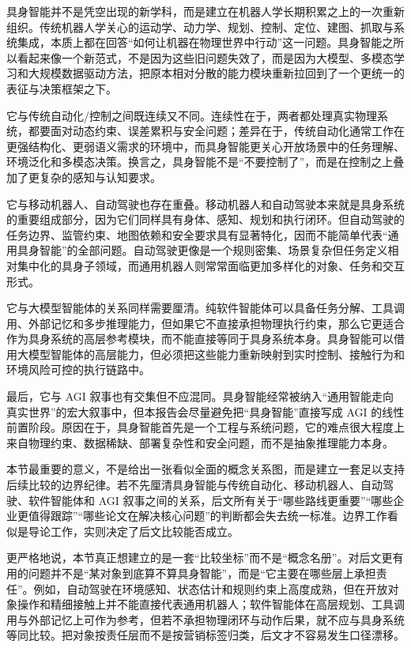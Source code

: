 具身智能并不是凭空出现的新学科，而是建立在机器人学长期积累之上的一次重新组织。传统机器人学关心的运动学、动力学、规划、控制、定位、建图、抓取与系统集成，本质上都在回答“如何让机器在物理世界中行动”这一问题。具身智能之所以看起来像一个新范式，不是因为这些旧问题失效了，而是因为大模型、多模态学习和大规模数据驱动方法，把原本相对分散的能力模块重新拉回到了一个更统一的表征与决策框架之下。

它与传统自动化/控制之间既连续又不同。连续性在于，两者都处理真实物理系统，都要面对动态约束、误差累积与安全问题；差异在于，传统自动化通常工作在更强结构化、更弱语义需求的环境中，而具身智能更关心开放场景中的任务理解、环境泛化和多模态决策。换言之，具身智能不是“不要控制了”，而是在控制之上叠加了更复杂的感知与认知要求。

它与移动机器人、自动驾驶也存在重叠。移动机器人和自动驾驶本来就是具身系统的重要组成部分，因为它们同样具有身体、感知、规划和执行闭环。但自动驾驶的任务边界、监管约束、地图依赖和安全要求具有显著特化，因而不能简单代表“通用具身智能”的全部问题。自动驾驶更像是一个规则密集、场景复杂但任务定义相对集中化的具身子领域，而通用机器人则常常面临更加多样化的对象、任务和交互形式。

它与大模型智能体的关系同样需要厘清。纯软件智能体可以具备任务分解、工具调用、外部记忆和多步推理能力，但如果它不直接承担物理执行约束，那么它更适合作为具身系统的高层参考模块，而不能直接等同于具身系统本身。具身智能可以借用大模型智能体的高层能力，但必须把这些能力重新映射到实时控制、接触行为和环境风险可控的执行链路中。

最后，它与 AGI 叙事也有交集但不应混同。具身智能经常被纳入“通用智能走向真实世界”的宏大叙事中，但本报告会尽量避免把“具身智能”直接写成 AGI 的线性前置阶段。原因在于，具身智能首先是一个工程与系统问题，它的难点很大程度上来自物理约束、数据稀缺、部署复杂性和安全问题，而不是抽象推理能力本身。

本节最重要的意义，不是给出一张看似全面的概念关系图，而是建立一套足以支持后续比较的边界纪律。若不先厘清具身智能与传统自动化、移动机器人、自动驾驶、软件智能体和 AGI 叙事之间的关系，后文所有关于“哪些路线更重要”“哪些企业更值得跟踪”“哪些论文在解决核心问题”的判断都会失去统一标准。边界工作看似是导论工作，实则决定了后文比较能否成立。

更严格地说，本节真正想建立的是一套“比较坐标”而不是“概念名册”。对后文更有用的问题并不是“某对象到底算不算具身智能”，而是“它主要在哪些层上承担责任”。例如，自动驾驶在环境感知、状态估计和规则约束上高度成熟，但在开放对象操作和精细接触上并不能直接代表通用机器人；软件智能体在高层规划、工具调用与外部记忆上可作为参考，但若不承担物理闭环与动作后果，就不应与具身系统等同比较。把对象按责任层而不是按营销标签归类，后文才不容易发生口径漂移。

